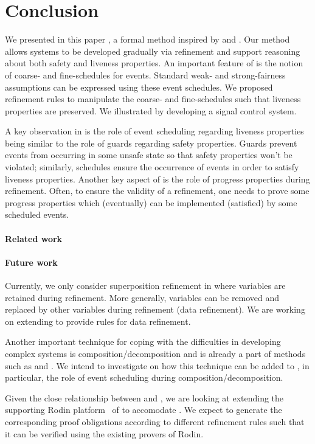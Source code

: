 \section{Conclusion}
\label{sec:conclusion}

We presented in this paper \unitb, a formal method inspired by \eventB
and \unity.  Our method allows systems to be developed gradually via
refinement and support reasoning about both safety and liveness
properties.  An important feature of \unitb is the notion of coarse-
and fine-schedules for events.  Standard weak- and strong-fairness
assumptions can be expressed using these event schedules.  We
proposed refinement rules to manipulate the coarse-
and fine-schedules such that liveness properties are
preserved.  We illustrated \unitb by developing a signal control
system.

A key observation in \unitb is the role of event scheduling regarding
liveness properties being similar to the role of guards regarding safety
properties.  Guards prevent events from occurring in some unsafe state so
that safety properties won't be violated; similarly, schedules ensure the
occurrence of events in order to satisfy liveness properties.  Another
key aspect of \unitb is the role of progress properties during
refinement.  Often, to ensure the validity of a refinement, one needs
to prove some progress properties which (eventually) can be
implemented (satisfied) by some scheduled events.

\paragraph{Related work}


\paragraph{Future work}
Currently, we only consider superposition refinement in \unitb where
variables are retained during refinement.  More generally, variables
can be removed and replaced by other variables during refinement (data
refinement). We are working on extending \unitb to provide rules for data
refinement.

Another important technique for coping with the difficulties in
developing complex systems is composition/decomposition and is already
a part of methods such as \eventB and \unity.  We intend to investigate
on how this technique can be added to \unitb, in particular, the role
of event scheduling during composition/decomposition.

Given the close relationship between \unitb and \eventB, we are
looking at extending the supporting Rodin
platform~\cite{abrial10:_rodin} of \eventB to accomodate \unitb.  We
expect to generate the corresponding proof obligations according to
different refinement rules such that it can be verified using the
existing provers of Rodin.


